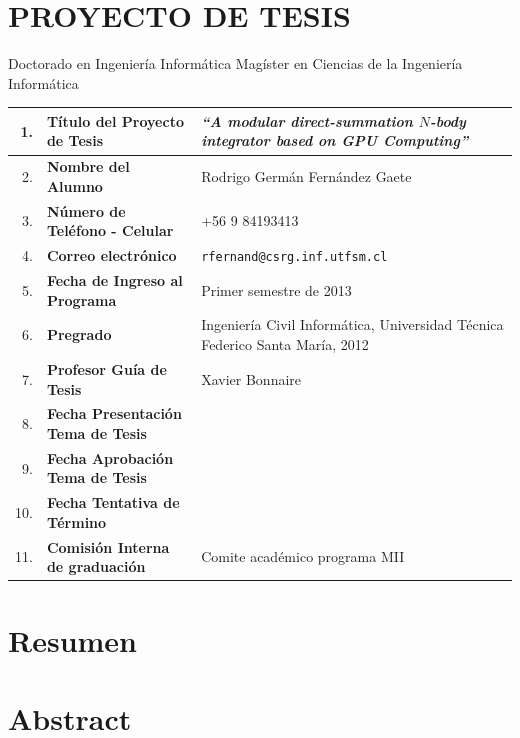 \documentclass[12pt,spanish]{article}
\makeatletter
\newcommand{\tnhl}{\tabularnewline\hline}
\newcommand{\nl}{\newline}
\newcommand{\thesis}{\emph{``A modular direct-summation $N$-body integrator
                             based on GPU Computing''}}
\newcommand{\name}{Rodrigo Germán Fernández Gaete}
\newcommand{\tel}{+56 9 84193413}
\newcommand{\email}{\texttt{rfernand@csrg.inf.utfsm.cl}}
\newcommand{\idate}{Primer semestre de 2013}
\newcommand{\prof}{Xavier Bonnaire}
\newcommand{\degree}{Ingeniería Civil Informática,
                     Universidad Técnica Federico Santa María, 2012}
\newcommand{\pdate}{}
\newcommand{\adate}{}
\newcommand{\tdate}{}
\newcommand{\comi}{Comite académico programa MII}
\makeatother
\begin{document}
\section*{PROYECTO DE TESIS}
{\huge \Square} Doctorado en Ingeniería Informática
\nl\nl\noindent
{\huge \XBox} Magíster en Ciencias de la Ingeniería Informática

\begin{center}
\begin{tabular}{|r p{}|p{}|}
\hline
  1. & {\bf Título del Proyecto de Tesis    }  & \thesis  \tnhl
  2. & {\bf Nombre del Alumno               }  & \name    \tnhl
  3. & {\bf Número de Teléfono - Celular    }  & \tel     \tnhl
  4. & {\bf Correo electrónico              }  & \email   \tnhl
  5. & {\bf Fecha de Ingreso al Programa    }  & \idate   \tnhl
  6. & {\bf Pregrado                        }  & \degree  \tnhl
  7. & {\bf Profesor Guía de Tesis          }  & \prof    \tnhl
  8. & {\bf Fecha Presentación Tema de Tesis}  & \pdate   \tnhl
  9. & {\bf Fecha Aprobación Tema de Tesis  }  & \adate   \tnhl
 10. & {\bf Fecha Tentativa de Término      }  & \tdate   \tnhl
 11. & {\bf Comisión Interna de graduación  }  & \comi    \tnhl
\end{tabular}
\end{center}
\vfill
\section{Resumen}

\vfill
\section*{Abstract}
\end{document}
